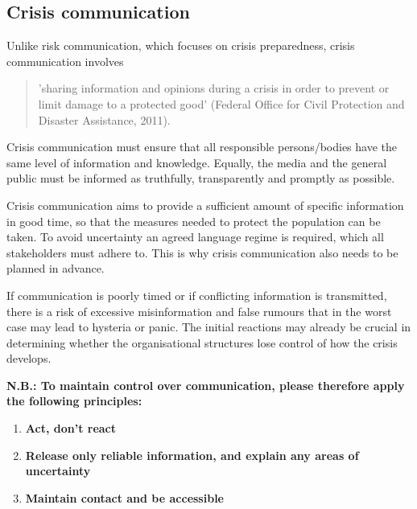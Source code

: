 \documentclass{article}
\begin{document}
\subsection{Crisis communication}\label{H2846710}



Unlike risk communication, which focuses on crisis preparedness, crisis communication involves

\begin{quote}



'sharing information and opinions during a crisis in order to prevent or limit damage to a protected good' (Federal Office for Civil Protection and Disaster Assistance, 2011).


\end{quote}


Crisis communication must ensure that all responsible persons/bodies have the same level of information and knowledge. Equally, the media and the general public must be informed as truthfully, transparently and promptly as possible.


Crisis communication aims to provide a sufficient amount of specific information in good time, so that the measures needed to protect the population can be taken. To avoid uncertainty an agreed language regime is required, which all stakeholders must adhere to. This is why crisis communication also needs to be planned in advance.


If communication is poorly timed or if conflicting information is transmitted, there is a risk of excessive misinformation and false rumours that in the worst case may lead to hysteria or panic. The initial reactions may already be crucial in determining whether the organisational structures lose control of how the crisis develops.


\textbf{N.B.: To maintain control over communication, please therefore apply the following principles:}

\begin{enumerate}
\item \textbf{Act, don't react}


\item \textbf{Release only reliable information, and explain any areas of uncertainty}


\item \textbf{Maintain contact and be accessible}


\end{enumerate}
\end{document}
